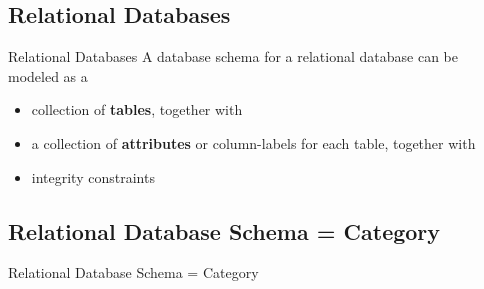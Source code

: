 \documentclass[utf8x]{beamer}
\begin{document}
  \subsection{Relational Databases}
    \begin{frame}{Relational Databases}
      A database schema for a relational database can be modeled as a
      \begin{itemize}
        \item collection of \textbf{tables}, \pause together with 
        \item a collection of \textbf{attributes} or column-labels for each table, \pause together with
        \item integrity constraints \pause
      \end{itemize}
      \begin{center}
      \end{center}
    \end{frame}
    
  \subsection{Relational Database Schema = Category}
    \begin{frame}{Relational Database Schema = Category}
      \begin{center}
      \end{center}
    \end{frame}
    
\end{document}
